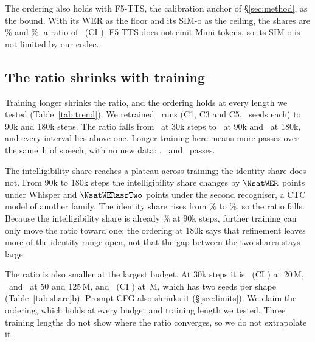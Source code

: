 The ordering also holds with F5-TTS, the calibration anchor of \S\ref{sec:method}, as the
bound. With its WER as the floor and its SIM-o as the ceiling, the shares are
\NcrsFfBoundWER\% and \NcrsFfBoundSIM\%, a ratio of \NcrsFfBoundRatio\ (CI
\NcrsFfBoundRatioci). F5-TTS does not emit Mimi tokens, so its SIM-o is not limited by our
codec.

\subsection{The ratio shrinks with training}
\label{sec:trend}
Training longer shrinks the ratio, and the ordering holds at every length we tested
(Table~\ref{tab:trend}). We retrained \NtrendRuns\ runs (C1, C3 and C5, \Nseeds\ seeds each)
to 90k and 180k steps. The ratio falls from \NgapThirtykRatio\ at 30k steps to
\NgapNinetykRatio\ at 90k and \NgapEightykRatio\ at 180k, and every interval lies above one.
Longer training here means more passes over the same \NtrainHours\,h of speech, with no new
data: \NcrsEpochsThirtyk, \NcrsEpochsNinetyk\ and \NcrsEpochsEightyk\ passes.

\begin{table}[htbp]
  \centering\small
  \caption{\emph{The ratio shrinks with training.} The same \NtrendRuns\ runs at three
  training lengths, $T{=}1$ to $16$. Column 3 re-transcribes the same audio; intervals
  resample configurations and items (1000 replicates). The 180k row uses run records not yet
  in the public release (App.~\ref{app:repro}).}
  \label{tab:trend}
  
\end{table}

The intelligibility share reaches a plateau across training; the identity share does not.
From 90k to 180k steps the intelligibility share changes by $\NsatWER$ points under Whisper
and $\NsatWERasrTwo$ points under the second recogniser, a CTC model of another family. The
identity share rises from \NgapNinetykSIM\% to \NgapEightykSIM\%, so the ratio falls. Because
the intelligibility share is already \NgapNinetykWER\% at 90k steps, further training can
only move the ratio toward one; the ordering at 180k says that refinement leaves more of the
identity range open, not that the gap between the two shares stays large.

The ratio is also smaller at the largest budget. At 30k steps it is \NcrsBudgetARatio\ (CI
\NcrsBudgetARatioci) at 20\,M, \NcrsBudgetBRatio\ and \NcrsBudgetCRatio\ at 50 and 125\,M,
and \NcrsBudgetDRatio\ (CI \NcrsBudgetDRatioci) at \NmaxNfour\,M, which has two seeds per
shape (Table~\ref{tab:share}b). Prompt CFG also shrinks it (\S\ref{sec:limits}). We claim
the ordering, which holds at every budget and training length we tested. Three training
lengths do not show where the ratio converges, so we do not extrapolate it.
